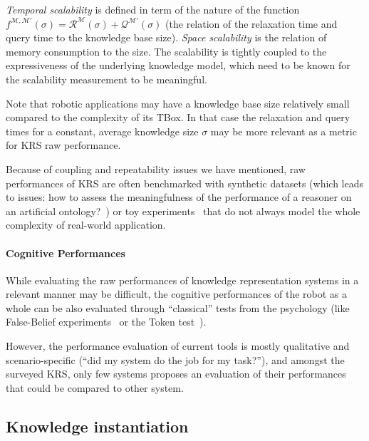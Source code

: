 \emph{Temporal scalability} is defined in term of the nature of the function
$f^{\mathcal{M}, \mathcal{M}'}(\sigma) = \mathcal{R}^{\mathcal{M}}(\sigma) +
\mathcal{Q}^{\mathcal{M}'}(\sigma)$ (\ie the relation of the relaxation time
and query time to the knowledge base size). \emph{Space scalability} is the
relation of memory consumption to the size. The scalability is tightly coupled
to the expressiveness of the underlying knowledge model, which need to be known
for the scalability measurement to be meaningful.

Note that robotic applications may have a knowledge base size relatively small
compared to the complexity of its TBox. In that case the relaxation and query
times for a constant, average knowledge size $\sigma$ may be more relevant as a
metric for KRS raw performance.

Because of coupling and repeatability issues we have mentioned, raw
performances of KRS are often benchmarked with synthetic datasets (which leads
to issues: how to assess the meaningfulness of the performance of a reasoner on
an artificial ontology?~\cite{Bail2010}) or toy experiments~\cite{Chong2009}
that do not always model the whole complexity of real-world application.

\paragraph{Cognitive Performances} While evaluating the raw performances of
knowledge representation systems in a relevant manner may be difficult, the cognitive
performances of the robot as a whole can be also evaluated through
``classical'' tests from the psychology (like False-Belief
experiments~\cite{Leslie2000} or the Token test~\cite{DiSimoni1978}).

However, the performance evaluation of current tools is mostly qualitative and
scenario-specific (``did my system do the job for my task?''), and amongst the
surveyed KRS, only few systems proposes an evaluation of their performances
that could be compared to other system.

\subsection{Knowledge instantiation}

\begin{scriptsize}
\begin{center}
\end{center}
\end{scriptsize}

